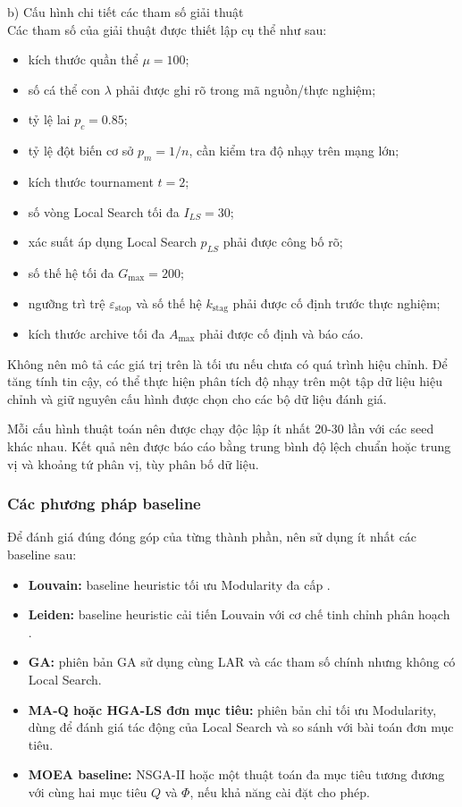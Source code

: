 \documentclass[14pt,a4paper]{extarticle}
\begin{document}
\noindent b) Cấu hình chi tiết các tham số giải thuật \\
Các tham số của giải thuật được thiết lập cụ thể như sau:
\begin{itemize}
    \item kích thước quần thể $\mu=100$;
    \item số cá thể con $\lambda$ phải được ghi rõ trong mã nguồn/thực nghiệm;
    \item tỷ lệ lai $p_c=0.85$;
    \item tỷ lệ đột biến cơ sở $p_m=1/n$, cần kiểm tra độ nhạy trên mạng lớn;
    \item kích thước tournament $t=2$;
    \item số vòng Local Search tối đa $I_{LS}=30$;
    \item xác suất áp dụng Local Search $p_{LS}$ phải được công bố rõ;
    \item số thế hệ tối đa $G_{\max}=200$;
    \item ngưỡng trì trệ $\varepsilon_{\mathrm{stop}}$ và số thế hệ $k_{\mathrm{stag}}$ phải được cố định trước thực nghiệm;
    \item kích thước archive tối đa $A_{\max}$ phải được cố định và báo cáo.
\end{itemize}

Không nên mô tả các giá trị trên là tối ưu nếu chưa có quá trình hiệu chỉnh. Để tăng tính tin cậy, có thể thực hiện phân tích độ nhạy trên một tập dữ liệu hiệu chỉnh và giữ nguyên cấu hình được chọn cho các bộ dữ liệu đánh giá.

Mỗi cấu hình thuật toán nên được chạy độc lập ít nhất 20-30 lần với các seed khác nhau. Kết quả nên được báo cáo bằng trung bình độ lệch chuẩn hoặc trung vị và khoảng tứ phân vị, tùy phân bố dữ liệu.

\subsubsection{Các phương pháp baseline}

Để đánh giá đúng đóng góp của từng thành phần, nên sử dụng ít nhất các baseline sau:
\begin{itemize}
    \item \textbf{Louvain:} baseline heuristic tối ưu Modularity đa cấp \cite{Blondel2008}.
    \item \textbf{Leiden:} baseline heuristic cải tiến Louvain với cơ chế tinh chỉnh phân hoạch \cite{Traag2019}.
    \item \textbf{GA:} phiên bản GA sử dụng cùng LAR và các tham số chính nhưng không có Local Search.
    \item \textbf{MA-Q hoặc HGA-LS đơn mục tiêu:} phiên bản chỉ tối ưu Modularity, dùng để đánh giá tác động của Local Search và so sánh với bài toán đơn mục tiêu.
    \item \textbf{MOEA baseline:} NSGA-II hoặc một thuật toán đa mục tiêu tương đương với cùng hai mục tiêu $Q$ và $\Phi$, nếu khả năng cài đặt cho phép.
\end{itemize}
\end{document}
